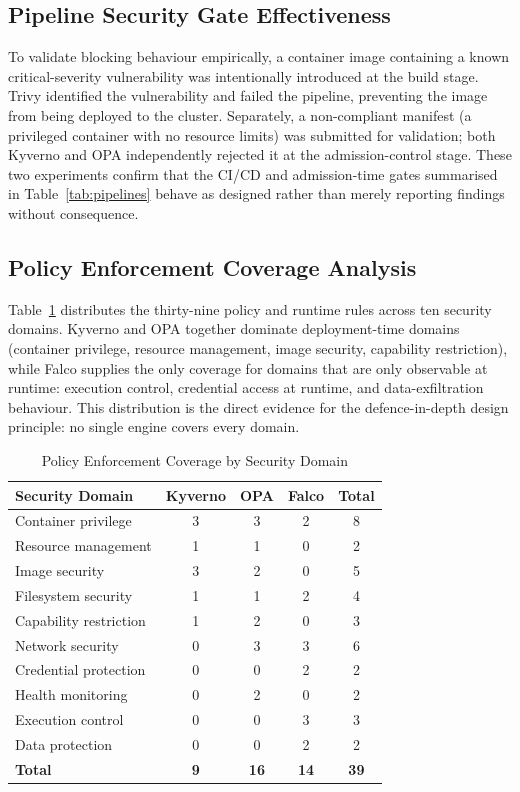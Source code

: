 \documentclass[conference]{IEEEtran}
\begin{document}
\subsection{Pipeline Security Gate Effectiveness}
To validate blocking behaviour empirically, a container image containing a known critical-severity vulnerability was intentionally introduced at the build stage. Trivy identified the vulnerability and failed the pipeline, preventing the image from being deployed to the cluster. Separately, a non-compliant manifest (a privileged container with no resource limits) was submitted for validation; both Kyverno and OPA independently rejected it at the admission-control stage. These two experiments confirm that the CI/CD and admission-time gates summarised in Table~\ref{tab:pipelines} behave as designed rather than merely reporting findings without consequence.

\subsection{Policy Enforcement Coverage Analysis}
Table~\ref{tab:coverage} distributes the thirty-nine policy and runtime rules across ten security domains. Kyverno and OPA together dominate deployment-time domains (container privilege, resource management, image security, capability restriction), while Falco supplies the only coverage for domains that are only observable at runtime: execution control, credential access at runtime, and data-exfiltration behaviour. This distribution is the direct evidence for the defence-in-depth design principle: no single engine covers every domain.

\begin{table}[!t]
\caption{Policy Enforcement Coverage by Security Domain}
\label{tab:coverage}
\centering
\footnotesize
\begin{tabular}{@{}p{2.1cm}ccc c@{}}
\toprule
\textbf{Security Domain} & \textbf{Kyverno} & \textbf{OPA} & \textbf{Falco} & \textbf{Total} \\
\midrule
Container privilege & 3 & 3 & 2 & 8 \\
Resource management & 1 & 1 & 0 & 2 \\
Image security & 3 & 2 & 0 & 5 \\
Filesystem security & 1 & 1 & 2 & 4 \\
Capability restriction & 1 & 2 & 0 & 3 \\
Network security & 0 & 3 & 3 & 6 \\
Credential protection & 0 & 0 & 2 & 2 \\
Health monitoring & 0 & 2 & 0 & 2 \\
Execution control & 0 & 0 & 3 & 3 \\
Data protection & 0 & 0 & 2 & 2 \\
\midrule
\textbf{Total} & \textbf{9} & \textbf{16} & \textbf{14} & \textbf{39} \\
\bottomrule
\end{tabular}
\end{table}
\end{document}
